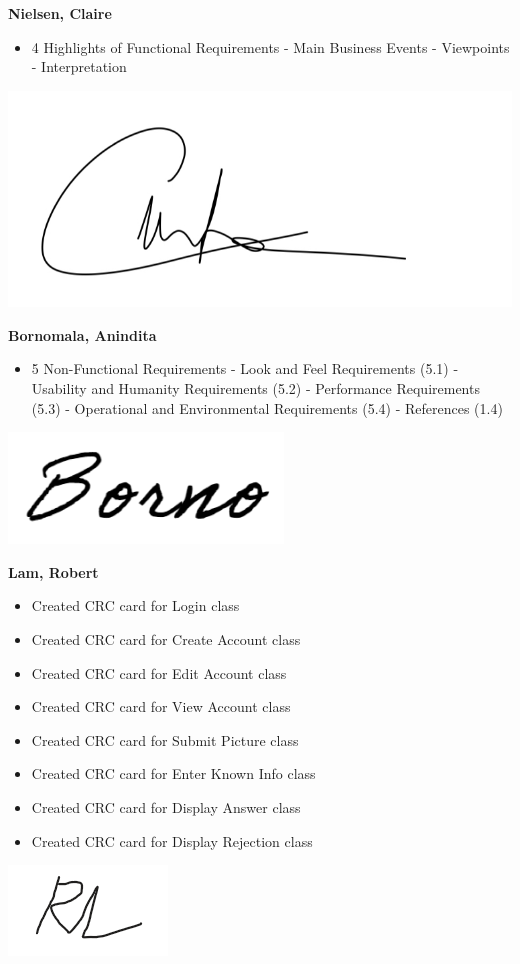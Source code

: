 \documentclass[]{article}
\begin{document}
\textbf{Nielsen, Claire}
\begin{itemize}
        \item 4 Highlights of Functional Requirements
            \subitem - Main Business Events
            \subitem - Viewpoints
            \subitem - Interpretation
\end{itemize}
\includegraphics[scale=0.15]{clairesignature.jpg}

\textbf{Bornomala, Anindita}
\begin{itemize}
        \item 5 Non-Functional Requirements
            \subitem - Look and Feel Requirements (5.1)
            \subitem - Usability and Humanity Requirements (5.2)
            \subitem - Performance Requirements (5.3)
            \subitem - Operational and Environmental Requirements (5.4)
            \subitem - References (1.4)
\end{itemize}
\includegraphics[scale=0.50]{bornosignature.png}

\textbf{Lam, Robert}
\begin{itemize}
        \item Created CRC card for Login class
		\item Created CRC card for Create Account class
		\item Created CRC card for Edit Account class
		\item Created CRC card for View Account class
		\item Created CRC card for Submit Picture class
		\item Created CRC card for Enter Known Info class
		\item Created CRC card for Display Answer class
		\item Created CRC card for Display Rejection class
\end{itemize}
\includegraphics[scale=1]{robertsignature.png}

\end{document}
